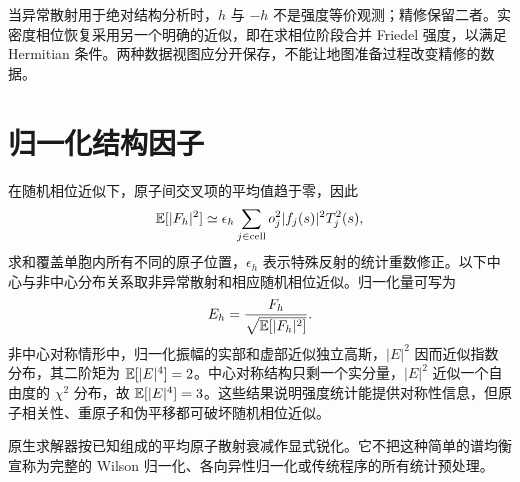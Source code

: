 当异常散射用于绝对结构分析时，$h$ 与 $-h$ 不是强度等价观测；精修保留二者。实密度相位恢复采用另一个明确的近似，即在求相位阶段合并 Friedel 强度，以满足 Hermitian 条件。两种数据视图应分开保存，不能让地图准备过程改变精修的数据。

\section{归一化结构因子}
在随机相位近似下，原子间交叉项的平均值趋于零，因此
\begin{equation}
\mathbb{E}[|F_h|^2]\simeq\epsilon_h\sum_{j\in\mathrm{cell}}o_j^2|f_j(s)|^2T_j^2(s),
\end{equation}
求和覆盖单胞内所有不同的原子位置，$\epsilon_h$ 表示特殊反射的统计重数修正。以下中心与非中心分布关系取非异常散射和相应随机相位近似。归一化量可写为
\begin{equation}
E_h=\frac{F_h}{\sqrt{\mathbb{E}[|F_h|^2]}}.
\end{equation}
非中心对称情形中，归一化振幅的实部和虚部近似独立高斯，$|E|^2$ 因而近似指数分布，其二阶矩为 $\mathbb{E}[|E|^4]=2$。中心对称结构只剩一个实分量，$|E|^2$ 近似一个自由度的 $\chi^2$ 分布，故 $\mathbb{E}[|E|^4]=3$。这些结果说明强度统计能提供对称性信息，但原子相关性、重原子和伪平移都可破坏随机相位近似。

原生求解器按已知组成的平均原子散射衰减作显式锐化。它不把这种简单的谱均衡宣称为完整的 Wilson 归一化、各向异性归一化或传统程序的所有统计预处理。
